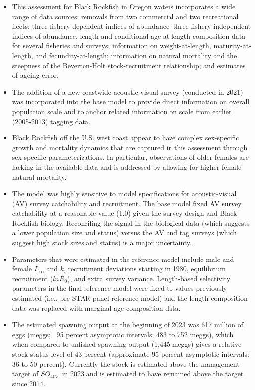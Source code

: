 \documentclass[11pt,
  english,
  letterpaper,
]{article}
\begin{document}
\begin{itemize}

\item This assessment for Black Rockfish in Oregon waters incorporates a wide range of data sources: removals from two commercial and two recreational fleets; three fishery-dependent indices of abundance, three fishery-independent indices of abundance, length and conditional age-at-length composition data for several fisheries and surveys; information on weight-at-length, maturity-at-length, and fecundity-at-length; information on natural mortality and the steepness of the Beverton-Holt stock-recruitment relationship; and estimates of ageing error.

\item The addition of a new coastwide acoustic-visual survey (conducted in 2021) was incorporated into the base model to provide direct information on overall population scale and to anchor related information on scale from earlier (2005-2013) tagging data.   

\item Black Rockfish off the U.S. west coast appear to have complex sex-specific growth and mortality dynamics that are captured in this assessment through sex-specific parameterizations. In particular, observations of older females are lacking in the available data and is addressed by allowing for higher female natural mortality.

\item The model was highly sensitive to model specifications for acoustic-visual (AV) survey catchability and recruitment. The base model fixed AV survey catchability at a reasonable value (1.0) given the survey design and Black Rockfish biology. Reconciling the signal in the
biological data (which suggests a lower population size and status) versus the AV and tag surveys (which suggest high stock sizes and status) is a major uncertainty.

\item Parameters that were estimated in the reference model include male and female $L_{\infty}$ and $k$, recruitment deviations starting in 1980, equilibrium recruitment ($lnR_0$), and extra survey variance.  Length-based selectivity parameters in the final reference model were fixed to values previously estimated (i.e., pre-STAR panel reference model) and the length composition data was replaced with marginal age composition data.

\item The estimated spawning output at the beginning of 2023 was 617 million of eggs (meggs; ~95 percent asymptotic intervals: 483 to 752 meggs), which when compared to unfished spawning output (1,445 meggs) gives a relative stock status level of 43 percent (approximate 95 percent asymptotic intervals: 36 to 50 percent).  Currently the stock is estimated above the management target of $SO_{40\%}$ in 2023 and is estimated to have remained above the target since 2014.


\end{itemize}
\end{document}
